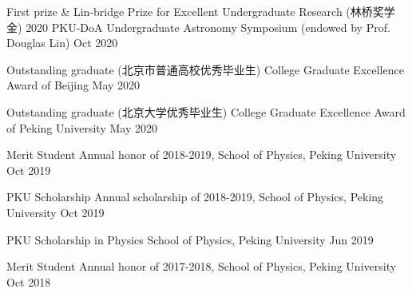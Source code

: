 




\begin{cvhonors}

\cvhonor
{First prize \& Lin-bridge Prize for Excellent Undergraduate Research (林桥奖学金)} %
{2020 PKU-DoA Undergraduate Astronomy Symposium (endowed by Prof. Douglas Lin)} %
{Oct 2020} %

\cvhonor
{Outstanding graduate (北京市普通高校优秀毕业生)} %
{College Graduate Excellence Award of Beijing} %
{May 2020} %

\cvhonor
{Outstanding graduate (北京大学优秀毕业生)} %
{College Graduate Excellence Award of Peking University} %
{May 2020} %

\cvhonor
{Merit Student} %
{Annual honor of 2018-2019, School of Physics, Peking University} %
{Oct 2019} %


\cvhonor
{PKU Scholarship} %
{Annual scholarship of 2018-2019, School of Physics, Peking University} %
{Oct 2019} %

\cvhonor
{PKU Scholarship in Physics} %
{School of Physics, Peking University} %
{Jun 2019} %




\cvhonor
{Merit Student} %
{Annual honor of 2017-2018, School of Physics, Peking University} %
{Oct 2018} %


\end{cvhonors}
